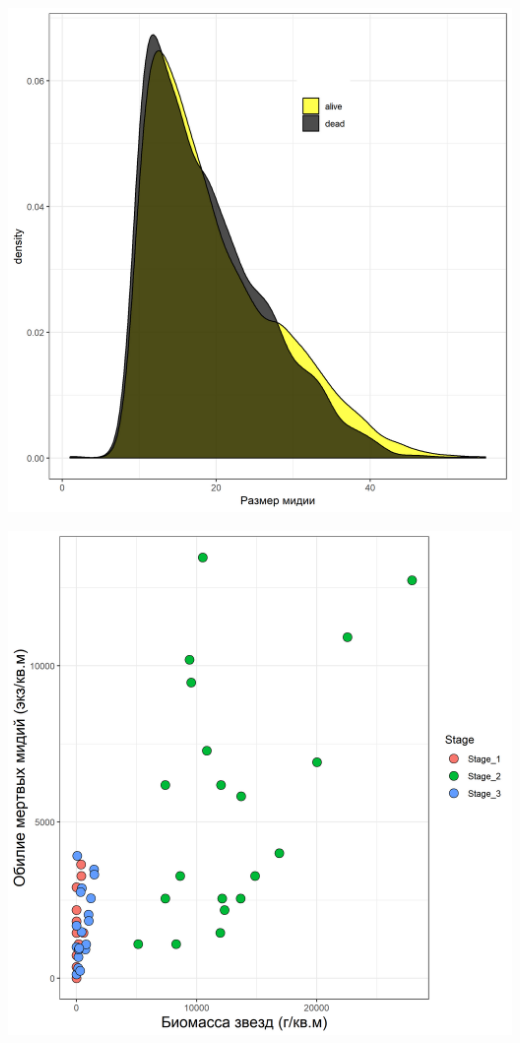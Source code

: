 \documentclass[a0,portrait]{a0poster}
\begin{document}
\begin{multicols}{2}
%
\begin{minipage}[t]{0.46\linewidth}		
	\begin{center}\vspace{0.1cm}
			\includegraphics[width=0.9\linewidth]{Size_dist_ast.png}
			\label{Fig_siz_ast}
		\end{center}\vspace{0.5cm}
\end{minipage}\hspace{1cm}
%
\begin{minipage}[t]{0.46\linewidth}		
	\begin{center}\vspace{0.1cm}
			\includegraphics[width=0.9\linewidth]{Baster_N_dead.png}

\end{center}
\end{minipage}
\end{multicols}
\end{document}
